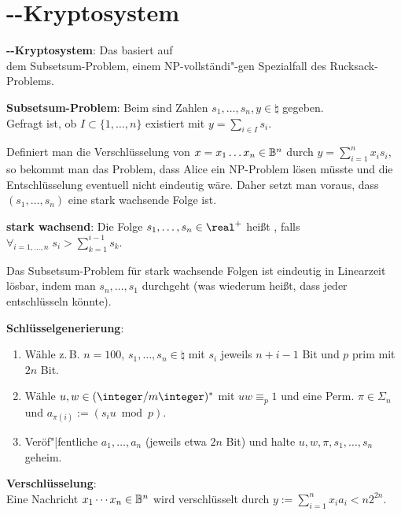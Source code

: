 \pagebreak

\section{%
    --Kryptosystem%
}

\textbf{--Kryptosystem}:
Das  basiert auf\\
dem Subsetsum-Problem, einem
NP-vollständi"-gen Spezialfall des Rucksack-Problems.

\textbf{Subsetsum-Problem}:
Beim  sind Zahlen $s_1, \dotsc, s_n, y \in \natural$ gegeben.\\
Gefragt ist, ob $I \subset \{1, \dotsc, n\}$ existiert mit $y = \sum_{i \in I} s_i$.

Definiert man die Verschlüsselung von $x = x_1 \dotsc x_n \in \mathbb{B}^n$ durch
$y = \sum_{i=1}^n x_i s_i$, so bekommt man das Problem, dass Alice ein NP-Problem lösen müsste
und die Entschlüsselung eventuell nicht eindeutig wäre.
Daher setzt man voraus, dass $(s_1, \dotsc, s_n)$ eine stark wachsende Folge ist.

\textbf{stark wachsend}:
Die Folge $s_1, \dotsc, s_n \in \real^+$ heißt , falls
$\forall_{i=1,\dotsc,n}\; s_i > \sum_{k=1}^{i-1} s_k$.

Das Subsetsum-Problem für stark wachsende Folgen ist eindeutig in Linearzeit lösbar,
indem man $s_n, \dotsc, s_1$ durchgeht (was wiederum heißt, dass jeder entschlüsseln könnte).

\linie

\textbf{Schlüsselgenerierung}:
\begin{enumerate}
    \item
    Wähle z.\,B. $n = 100$, $s_1, \dotsc, s_n \in \natural$ mit $s_i$ jeweils $n + i - 1$ Bit und
    $p$ prim mit $2n$ Bit.

    \item
    Wähle $u, w \in (\ZmZ)^\ast$ mit $uw \equiv_p 1$ und eine Perm. $\pi \in \Sigma_n$
    und $a_{\pi(i)} := (s_i u \bmod p)$.

    \item
    Veröf"|fentliche $a_1, \dotsc, a_n$ (jeweils etwa $2n$ Bit)
    und halte $u, w, \pi, s_1, \dotsc, s_n$ geheim.
\end{enumerate}

\textbf{Verschlüsselung}:\\
Eine Nachricht $x_1 \dotsb x_n \in \mathbb{B}^n$ wird verschlüsselt durch
$y := \sum_{i=1}^n x_i a_i < n 2^{2n}$.

